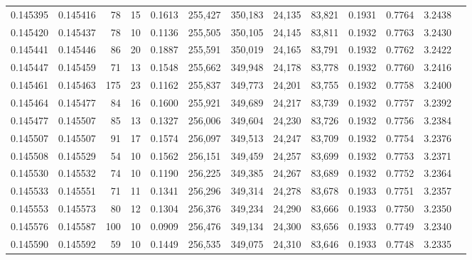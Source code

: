 \begin{tabular}{rrrrrrrrrrrrr}
0.145395 & 0.145416 &    78 &  15 &                                     0.1613 & 255,427 & 350,183 &  24,135 &  83,821 & 0.1931 & 0.7764 & 3.2438 \\
0.145420 & 0.145437 &    78 &  10 &                                     0.1136 & 255,505 & 350,105 &  24,145 &  83,811 & 0.1932 & 0.7763 & 3.2430 \\
0.145441 & 0.145446 &    86 &  20 &                                     0.1887 & 255,591 & 350,019 &  24,165 &  83,791 & 0.1932 & 0.7762 & 3.2422 \\
0.145447 & 0.145459 &    71 &  13 &                                     0.1548 & 255,662 & 349,948 &  24,178 &  83,778 & 0.1932 & 0.7760 & 3.2416 \\
0.145461 & 0.145463 &   175 &  23 &                                     0.1162 & 255,837 & 349,773 &  24,201 &  83,755 & 0.1932 & 0.7758 & 3.2400 \\
0.145464 & 0.145477 &    84 &  16 &                                     0.1600 & 255,921 & 349,689 &  24,217 &  83,739 & 0.1932 & 0.7757 & 3.2392 \\
0.145477 & 0.145507 &    85 &  13 &                                     0.1327 & 256,006 & 349,604 &  24,230 &  83,726 & 0.1932 & 0.7756 & 3.2384 \\
0.145507 & 0.145507 &    91 &  17 &                                     0.1574 & 256,097 & 349,513 &  24,247 &  83,709 & 0.1932 & 0.7754 & 3.2376 \\
0.145508 & 0.145529 &    54 &  10 &                                     0.1562 & 256,151 & 349,459 &  24,257 &  83,699 & 0.1932 & 0.7753 & 3.2371 \\
0.145530 & 0.145532 &    74 &  10 &                                     0.1190 & 256,225 & 349,385 &  24,267 &  83,689 & 0.1932 & 0.7752 & 3.2364 \\
0.145533 & 0.145551 &    71 &  11 &                                     0.1341 & 256,296 & 349,314 &  24,278 &  83,678 & 0.1933 & 0.7751 & 3.2357 \\
0.145553 & 0.145573 &    80 &  12 &                                     0.1304 & 256,376 & 349,234 &  24,290 &  83,666 & 0.1933 & 0.7750 & 3.2350 \\
0.145576 & 0.145587 &   100 &  10 &                                     0.0909 & 256,476 & 349,134 &  24,300 &  83,656 & 0.1933 & 0.7749 & 3.2340 \\
0.145590 & 0.145592 &    59 &  10 &                                     0.1449 & 256,535 & 349,075 &  24,310 &  83,646 & 0.1933 & 0.7748 & 3.2335 \\

\end{tabular}
